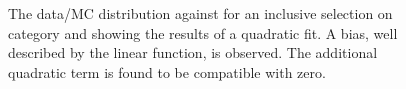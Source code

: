 \begin{figure}[h!]
  \centering
  ~~
  \\
  ~~
  \\
  \caption{\label{fig:linearMotiv} 
  The data/MC distribution against \mht for an inclusive selection on category and \scalht
  showing the results of a quadratic fit. A bias, well described by the linear function, 
  is observed. The additional quadratic term is found to be compatible with zero.
}
\end{figure}

